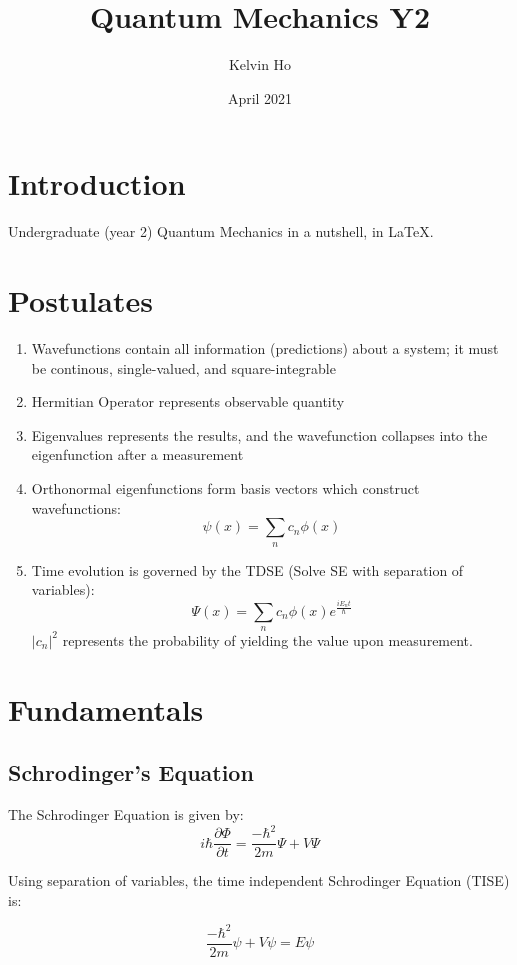 \documentclass[12pt]{article}
\title{Quantum Mechanics Y2}
\author{Kelvin Ho}
\date{April 2021}
\begin{document}
\maketitle



\section{Introduction}

Undergraduate (year 2) Quantum Mechanics in a nutshell, in \LaTeX.

\section{Postulates}

\begin{enumerate}
    \item Wavefunctions contain all information (predictions) about a system; it must be continous, single-valued, and square-integrable
    \item Hermitian Operator represents observable quantity
    \item Eigenvalues represents the results, and the wavefunction collapses into the eigenfunction after a measurement
    \item Orthonormal eigenfunctions form basis vectors which construct wavefunctions:
    \[\psi(x) = \sum_n c_n \phi(x)\]
    \item Time evolution is governed by the TDSE (Solve SE with separation of variables):
    \[\Psi(x) = \sum_n c_n \phi(x) e^{\frac{iE_nt}{\hbar}}\]
    $|c_n|^2$ represents the probability of yielding the value upon measurement.
\end{enumerate}

\section{Fundamentals}

\subsection{Schrodinger's Equation}
The Schrodinger Equation is given by:
\[ i\hbar \frac{\partial \Phi}{\partial t} = \frac{-\hbar^2}{2m} \Psi + V\Psi\]

Using separation of variables, the time independent Schrodinger Equation (TISE) is:

\[ \frac{-\hbar^2}{2m} \psi + V\psi = E\psi\]
\end{document}
